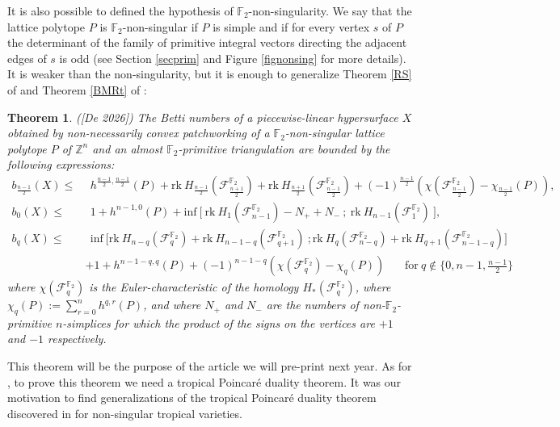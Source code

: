 \documentclass{article}
\newtheorem{theorem}{Theorem}
\begin{document}
It is also possible to defined the hypothesis of $\mathbb{F}_2$-non-singularity. We say that the lattice polytope $P$ is $\mathbb{F}_2$-non-singular if $P$ is simple and if for every vertex $s$ of $P$ the determinant of the family of primitive integral vectors directing the adjacent edges of $s$ is odd (see Section \ref{secprim} and Figure \ref{fignonsing} for more details). It is weaker than the non-singularity, but it is enough to generalize Theorem \ref{RS} of \cite{RS 2023} and Theorem \ref{BMRt} of \cite{BMR 2024}:

\begin{theorem}
    ([De 2026]) The Betti numbers of a piecewise-linear hypersurface $X$ obtained by non-necessarily convex patchworking of a $\mathbb{F}_2$-non-singular lattice polytope $P$ of $\mathbb{Z}^n$ and an almost $\mathbb{F}_2$-primitive triangulation are bounded by the following expressions:
    \begin{align*}
        b_{\frac{n-1}{2}}(X) \leq & ~~h^{\frac{n-1}{2},\frac{n-1}{2}}(P)+\mathrm{rk}~H_\frac{n-1}{2}(\mathcal{F}^{\mathbb{F}_2}_\frac{n+1}{2})+\mathrm{rk}~H_\frac{n+1}{2}(\mathcal{F}^{\mathbb{F}_2}_\frac{n-1}{2}) +(-1)^\frac{n-1}{2}(\chi(\mathcal{F}^{\mathbb{F}_2}_\frac{n-1}{2})-\chi_{\frac{n-1}{2}}(P)), \\
        b_0(X) \leq & ~~1+ h^{n-1,0}(P)+\mathrm{inf}~\Bigg[~\mathrm{rk}~H_1(\mathcal{F}^{\mathbb{F}_2}_{n-1}) - N_++N_-~;~\mathrm{rk}~H_{n-1}(\mathcal{F}^{\mathbb{F}_2}_1)~\Bigg], \\
        b_q(X) \leq & ~~\mathrm{inf}~ \Bigg [ \mathrm{rk}~H_{n-q}(\mathcal{F}^{\mathbb{F}_2}_q) + \mathrm{rk}~H_{n-1-q}(\mathcal{F}^{\mathbb{F}_2}_{q+1}) ~;\mathrm{rk}~H_{q}(\mathcal{F}^{\mathbb{F}_2}_{n-q}) + \mathrm{rk}~H_{q+1}(\mathcal{F}^{\mathbb{F}_2}_{n-1-q}) \Bigg] \\ & + 1+h^{n-1-q,q}(P) + (-1)^{n-1-q}(\chi(\mathcal{F}^{\mathbb{F}_2}_q)-\chi_q(P))~~~~~~~~\mathrm{for}~q\notin \Bigg\{0,n-1,\frac{n-1}{2}\Bigg\}
    \end{align*}
    where $\chi(\mathcal{F}^{\mathbb{F}_2}_q)$ is the Euler-characteristic of the homology $H_*(\mathcal{F}^{\mathbb{F}_2}_q)$, where $\chi_q(P):=\sum_{r=0}^nh^{q,r}(P)$, and where $N_+$ and $N_-$ are the numbers of non-$\mathbb{F}_2$-primitive $n$-simplices for which the product of the signs on the vertices are $+1$ and $-1$ respectively.
\end{theorem}

This theorem will be the purpose of the article \cite{De 2026} we will pre-print next year. As for \cite{RS 2023}, to prove this theorem we need a tropical Poincaré duality theorem. It was our motivation to find generalizations of the tropical Poincaré duality theorem discovered in \cite{JRS 2018} for non-singular tropical varieties.
\end{document}
